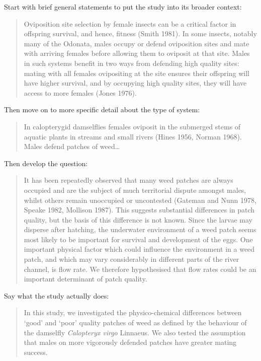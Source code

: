 \documentclass[
]{book}
\begin{document}
Start with brief general statements to put the study into its broader context:

\begin{quote}
Oviposition site selection by female insects can be a critical factor in offspring survival, and hence, fitness (Smith 1981). In some insects, notably many of the Odonata, males occupy or defend oviposition sites and mate with arriving females before allowing them to oviposit at that site. Males in such systems benefit in two ways from defending high quality sites: mating with all females ovipositing at the site ensures their offspring will have higher survival, and by occupying high quality sites, they will have access to more females (Jones 1976).
\end{quote}

Then move on to more specific detail about the type of system:

\begin{quote}
In calopterygid damselflies females oviposit in the submerged stems of aquatic plants in streams and small rivers (Hines 1956, Norman 1968). Males defend patches of weed\ldots{}
\end{quote}

Then develop the question:

\begin{quote}
It has been repeatedly observed that many weed patches are always occupied and are the subject of much territorial dispute amongst males, whilst others remain unoccupied or uncontested (Gateman and Nunn 1978, Speake 1982, Mollison 1987). This suggests substantial differences in patch quality, but the basis of this difference is not known. Since the larvae may disperse after hatching, the underwater environment of a weed patch seems most likely to be important for survival and development of the eggs. One important physical factor which could influence the environment in a weed patch, and which may vary considerably in different parts of the river channel, is flow rate. We therefore hypothesised that flow rates could be an important determinant of patch quality.
\end{quote}

Say what the study actually does:

\begin{quote}
In this study, we investigated the physico-chemical differences between `good' and `poor' quality patches of weed as defined by the behaviour of the damselfly \emph{Calopteryx virgo} Linnaeus. We also tested the assumption that males on more vigorously defended patches have greater mating success.
\end{quote}
\end{document}
